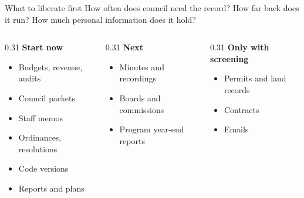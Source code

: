 \documentclass[9pt,aspectratio=169,onlytextwidth]{beamer}
\begin{document}
\begin{frame}{What to liberate first}
    How often does council need the record? How far back does it run? How much personal information does it hold?

    \bigskip

    \begin{columns}[T]\small\flushitems
        \begin{column}{0.31\textwidth}
            \textbf{Start now}

            \begin{itemize}\small
                \item Budgets, revenue, audits
                \item Council packets
                \item Staff memos
                \item Ordinances, resolutions
                \item Code versions
                \item Reports and plans
            \end{itemize}
        \end{column}
        \begin{column}{0.31\textwidth}
            \textbf{Next}

            \begin{itemize}\small
                \item Minutes and recordings
                \item Boards and commissions
                \item Program year-end reports
            \end{itemize}
        \end{column}
        \begin{column}{0.31\textwidth}
            \textbf{Only with screening}

            \begin{itemize}\small
                \item Permits and land records
                \item Contracts
                \item Emails
            \end{itemize}
        \end{column}
    \end{columns}

\end{frame}


\end{document}
